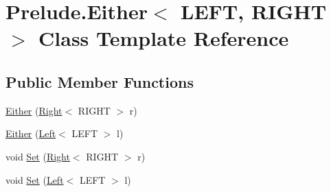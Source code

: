 \hypertarget{class_prelude_1_1_either_3_01_l_e_f_t_00_01_r_i_g_h_t_01_4}{\section{Prelude.\+Either$<$ L\+E\+F\+T, R\+I\+G\+H\+T $>$ Class Template Reference}
\label{class_prelude_1_1_either_3_01_l_e_f_t_00_01_r_i_g_h_t_01_4}
}
\subsection*{Public Member Functions}
\begin{DoxyCompactItemize}
\item 
\hyperlink{class_prelude_1_1_either_3_01_l_e_f_t_00_01_r_i_g_h_t_01_4_a04e331d9cdf0f5b21a8d9e84645f34b4}{Either} (\hyperlink{class_prelude_1_1_either_3_01_l_e_f_t_00_01_r_i_g_h_t_01_4_ab9e80a843929ecdd2860f3a7d1ed593a}{Right}$<$ R\+I\+G\+H\+T $>$ r)
\item 
\hyperlink{class_prelude_1_1_either_3_01_l_e_f_t_00_01_r_i_g_h_t_01_4_ab89b8cfc1bdb529557fa66fe6d490ec2}{Either} (\hyperlink{class_prelude_1_1_either_3_01_l_e_f_t_00_01_r_i_g_h_t_01_4_a4330760975e79ad64dd43fdff183d411}{Left}$<$ L\+E\+F\+T $>$ l)
\item 
void \hyperlink{class_prelude_1_1_either_3_01_l_e_f_t_00_01_r_i_g_h_t_01_4_a038cf74b4741b2f9056311a7e74f7faf}{Set} (\hyperlink{class_prelude_1_1_either_3_01_l_e_f_t_00_01_r_i_g_h_t_01_4_ab9e80a843929ecdd2860f3a7d1ed593a}{Right}$<$ R\+I\+G\+H\+T $>$ r)
\item 
void \hyperlink{class_prelude_1_1_either_3_01_l_e_f_t_00_01_r_i_g_h_t_01_4_a92fbd687217c70aa017dfed4c52fb34e}{Set} (\hyperlink{class_prelude_1_1_either_3_01_l_e_f_t_00_01_r_i_g_h_t_01_4_a4330760975e79ad64dd43fdff183d411}{Left}$<$ L\+E\+F\+T $>$ l)
\end{DoxyCompactItemize}
